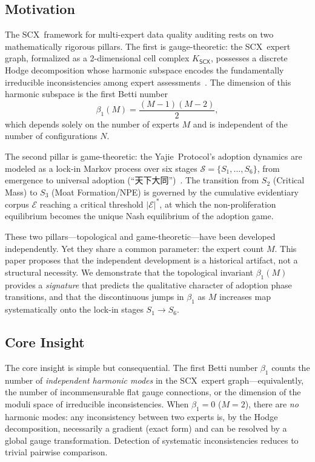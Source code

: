 \documentclass[12pt,a4paper]{article}
\theoremstyle{definition}
\theoremstyle{remark}
\theoremstyle{definition}
\newcommand{\CEC}{\mathcal{E}}
\newcommand{\SCX}{\textsf{SCX}}
\newcommand{\Yajie}{\textsf{Yajie}}
\newcommand{\CECstar}{|\CEC|^*}
\begin{document}
\subsection{Motivation}

The \SCX\ framework for multi-expert data quality auditing rests on two mathematically rigorous pillars. The first is gauge-theoretic: the \SCX\ expert graph, formalized as a 2-dimensional cell complex $K_{\SCX}$, possesses a discrete Hodge decomposition whose harmonic subspace encodes the fundamentally irreducible inconsistencies among expert assessments~\cite{scx_gauge_formalized,scx_fiber_bundle}. The dimension of this harmonic subspace is the first Betti number
\begin{equation}\label{eq:beta_def}
  \beta_1(M) = \frac{(M-1)(M-2)}{2},
\end{equation}
which depends solely on the number of experts $M$ and is independent of the number of configurations $N$.

The second pillar is game-theoretic: the \Yajie\ Protocol's adoption dynamics are modeled as a lock-in Markov process over six stages $\mathcal{S} = \{S_1,\ldots,S_6\}$, from emergence to universal adoption (``天下大同'')~\cite{yajie_protocol}. The transition from $S_2$ (Critical Mass) to $S_3$ (Moat Formation/NPE) is governed by the cumulative evidentiary corpus $\CEC$ reaching a critical threshold $\CECstar$, at which the non-proliferation equilibrium becomes the unique Nash equilibrium of the adoption game.

These two pillars---topological and game-theoretic---have been developed independently. Yet they share a common parameter: the expert count $M$. This paper proposes that the independent development is a historical artifact, not a structural necessity. We demonstrate that the topological invariant $\beta_1(M)$ provides a \emph{signature} that predicts the qualitative character of adoption phase transitions, and that the discontinuous jumps in $\beta_1$ as $M$ increases map systematically onto the lock-in stages $S_1 \to S_6$.

\subsection{Core Insight}

The core insight is simple but consequential. The first Betti number $\beta_1$ counts the number of \emph{independent harmonic modes} in the \SCX\ expert graph---equivalently, the number of incommensurable flat gauge connections, or the dimension of the moduli space of irreducible inconsistencies. When $\beta_1 = 0$ ($M=2$), there are \emph{no} harmonic modes: any inconsistency between two experts is, by the Hodge decomposition, necessarily a gradient (exact form) and can be resolved by a global gauge transformation. Detection of systematic inconsistencies reduces to trivial pairwise comparison.
\end{document}

